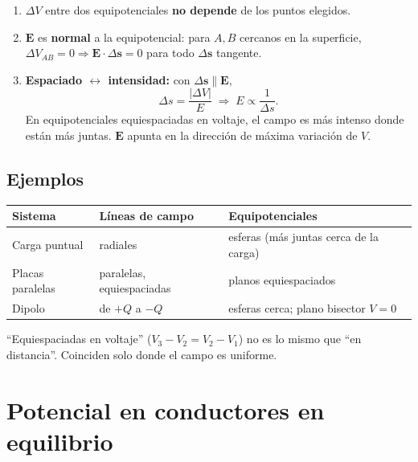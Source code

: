 \documentclass[12pt,a4paper]{article}
\begin{document}
\begin{enumerate}[nosep]
  \item $\Delta V$ entre dos equipotenciales \textbf{no depende} de los
        puntos elegidos.
  \item $\mathbf{E}$ es \textbf{normal} a la equipotencial: para $A,B$
        cercanos en la superficie, $\Delta V_{AB}=0 \Rightarrow
        \mathbf{E}\cdot\Delta\mathbf{s}=0$ para todo $\Delta\mathbf{s}$
        tangente.
  \item \textbf{Espaciado $\leftrightarrow$ intensidad:} con
        $\Delta\mathbf{s}\parallel\mathbf{E}$,
        \[
        \Delta s = \frac{|\Delta V|}{E} \;\Longrightarrow\; E \propto \frac{1}{\Delta s}.
        \]
        En equipotenciales equiespaciadas en voltaje, el campo es más
        intenso donde están más juntas. $\mathbf{E}$ apunta en la
        dirección de máxima variación de $V$.
\end{enumerate}

\subsection{Ejemplos}

\begin{center}
\begin{tabular}{lll}
\toprule
\textbf{Sistema} & \textbf{Líneas de campo} & \textbf{Equipotenciales} \\
\midrule
Carga puntual & radiales & esferas (más juntas cerca de la carga) \\
Placas paralelas & paralelas, equiespaciadas & planos equiespaciados \\
Dipolo & de $+Q$ a $-Q$ & esferas cerca; plano bisector $V=0$ \\
\bottomrule
\end{tabular}
\end{center}

\begin{notebox}[Vocabulario]
  \enquote{Equiespaciadas en voltaje} ($V_3-V_2=V_2-V_1$) no es lo mismo
  que \enquote{en distancia}. Coinciden solo donde el campo es uniforme.
\end{notebox}

\section{Potencial en conductores en equilibrio}
\end{document}
